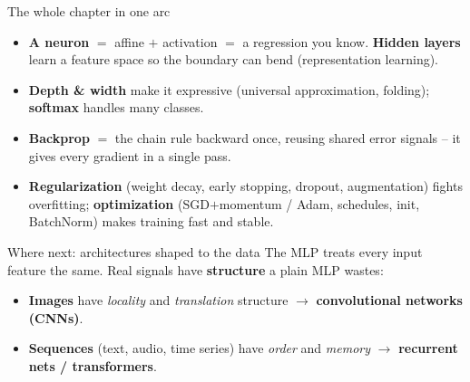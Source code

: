 \documentclass[aspectratio=43]{beamer}
\begin{document}
\begin{frame}{The whole chapter in one arc}
  \begin{itemize}\small
    \item \textbf{A neuron} $=$ affine $+$ activation $=$ a regression you know. \textbf{Hidden
      layers} learn a feature space so the boundary can bend (representation learning).
    \item \textbf{Depth \& width} make it expressive (universal approximation, folding);
      \textbf{softmax} handles many classes.
    \item \textbf{Backprop} $=$ the chain rule backward once, reusing shared error signals -- it
      gives every gradient in a single pass.
    \item \textbf{Regularization} (weight decay, early stopping, dropout, augmentation) fights
      overfitting; \textbf{optimization} (SGD$+$momentum / Adam, schedules, init, BatchNorm)
      makes training fast and stable.
  \end{itemize}
  \vfill
\end{frame}

\begin{frame}{Where next: architectures shaped to the data}
  The MLP treats every input feature the same. Real signals have \textbf{structure} a plain MLP
  wastes:
  \vfill
  \begin{itemize}\small
    \item \textbf{Images} have \emph{locality} and \emph{translation} structure $\to$
      \textbf{convolutional networks (CNNs)}.
    \item \textbf{Sequences} (text, audio, time series) have \emph{order} and \emph{memory} $\to$
      \textbf{recurrent nets / transformers}.
  \end{itemize}
  \vfill
\end{frame}
\end{document}
